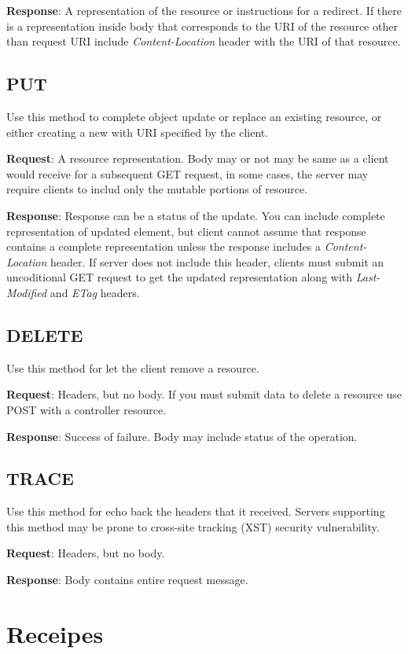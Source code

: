 \documentclass[11pt,a4paper]{article}
\begin{document}
\textbf{Response}: A representation of the resource or instructions for a redirect. If there is a representation inside body that corresponds to the URI of the resource other than request URI include \textit{Content-Location} header with the URI of that resource.

\subsection{PUT}
Use this method to complete object update or replace an existing resource, or either creating a new with URI specified by the client. 

\textbf{Request}: A resource representation. Body may or not may be same as a client would receive for a subsequent GET request, in some cases, the server may require clients to includ only the mutable portions of resource.

\textbf{Response}: Response can be a status of the update. You can include complete representation of updated element, but client cannot assume that response contains a complete representation unless the response includes a \textit{Content-Location} header. If server does not include this header, clients must submit an uncoditional GET request to get the updated representation along with \textit{Last-Modified} and \textit{ETag} headers.

\subsection{DELETE}
Use this method for let the client remove a resource.

\textbf{Request}: Headers, but no body. If you must submit data to delete a resource use POST with a controller resource.

\textbf{Response}: Success of failure. Body may include status of the operation.

\subsection{TRACE}
Use this method for echo back the headers that it received. Servers supporting this method may be prone to cross-site tracking (XST) security vulnerability.

\textbf{Request}: Headers, but no body.

\textbf{Response}: Body contains entire request message.

\section{Receipes}
\end{document}
